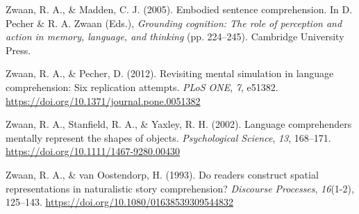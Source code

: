 \documentclass[
  man]{apa7}
\newlength{\cslhangindent}
\newlength{\cslentryspacingunit} %
\newenvironment{CSLReferences}[2] %
 {%
  \setlength{\parindent}{0pt}
  \ifodd #1
  \let\oldpar\par
  \def\par{\hangindent=\cslhangindent\oldpar}
  \fi
  \setlength{\parskip}{#2\cslentryspacingunit}
 }%
 {}
\begin{document}
\begin{CSLReferences}{1}{0}
\leavevmode{}%
Zwaan, R. A., \& Madden, C. J. (2005). Embodied sentence comprehension. In D. Pecher \& R. A. Zwaan (Eds.), \emph{Grounding cognition: {The} role of perception and action in memory, language, and thinking} (pp. 224--245). {Cambridge University Press}.

\leavevmode{}%
Zwaan, R. A., \& Pecher, D. (2012). Revisiting mental simulation in language comprehension: Six replication attempts. \emph{PLoS ONE}, \emph{7}, e51382. \url{https://doi.org/10.1371/journal.pone.0051382}

\leavevmode{}%
Zwaan, R. A., Stanfield, R. A., \& Yaxley, R. H. (2002). Language comprehenders mentally represent the shapes of objects. \emph{Psychological Science}, \emph{13}, 168--171. \url{https://doi.org/10.1111/1467-9280.00430}

\leavevmode{}%
Zwaan, R. A., \& van Oostendorp, H. (1993). Do readers construct spatial representations in naturalistic story comprehension? \emph{Discourse Processes}, \emph{16}(1-2), 125--143. \url{https://doi.org/10.1080/01638539309544832}

\end{CSLReferences}

\endgroup
\end{document}
